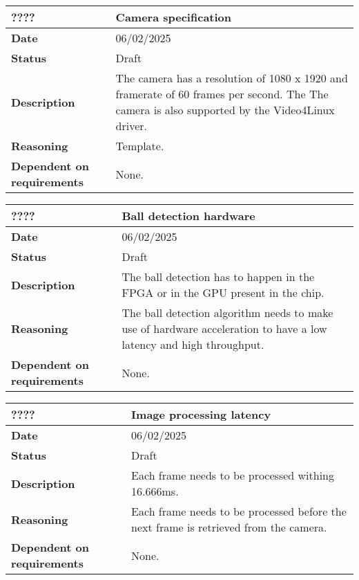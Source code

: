 \documentclass{article}
\begin{document}
\begin{table}[H]
    \renewcommand{\arraystretch}{1.3}
    \begin{tabular}{|l|p{10cm}|}
        \hline
        \rowcolor{gray!50}
        \textbf{????} & \textbf{Camera specification} \\ \hline
        \textbf{Date} & 06/02/2025 \\ \hline
        \textbf{Status} & Draft \\ \hline
        \textbf{Description} & The camera has a resolution of 1080 x 1920 and framerate of 60 frames per second. The 
        The camera is also supported by the Video4Linux \cite{Video4Linux} driver.\\ \hline

        \textbf{Reasoning} & Template. \\ \hline
        \textbf{Dependent on requirements} & None. \\ \hline
    \end{tabular}
\end{table}

\begin{table}[H]
    \renewcommand{\arraystretch}{1.3}
    \begin{tabular}{|l|p{10cm}|}
        \hline
        \rowcolor{gray!50}
        \textbf{????} & \textbf{Ball detection hardware} \\ \hline
        \textbf{Date} & 06/02/2025 \\ \hline
        \textbf{Status} & Draft \\ \hline
        \textbf{Description} & The ball detection has to happen in the FPGA or in the GPU present in the chip. \\ \hline
        \textbf{Reasoning} & The ball detection algorithm needs to make use of hardware acceleration to have a low latency and high throughput. \\ \hline
        \textbf{Dependent on requirements} & None. \\ \hline
    \end{tabular}
\end{table}

\begin{table}[H]
    \renewcommand{\arraystretch}{1.3}
    \begin{tabular}{|l|p{10cm}|}
        \hline
        \rowcolor{gray!50}
        \textbf{????} & \textbf{Image processing latency} \\ \hline
        \textbf{Date} & 06/02/2025 \\ \hline
        \textbf{Status} & Draft \\ \hline
        \textbf{Description} & Each frame needs to be processed withing 16.666ms. \\ \hline
        \textbf{Reasoning} & Each frame needs to be processed before the next frame is retrieved from the camera. \\ \hline
        \textbf{Dependent on requirements} & None. \\ \hline
    \end{tabular}
\end{table}
\end{document}
